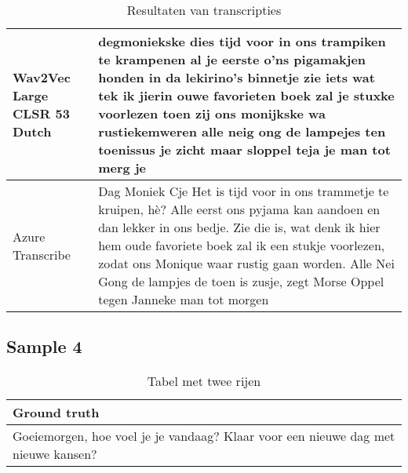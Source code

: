 \begin{table}[htbp]
\begin{tabularx}{\textwidth}{|l|X|}
    Wav2Vec Large CLSR 53 Dutch &     degmoniekske dies tijd voor in ons trampiken te krampenen al je eerste o'ns pigamakjen honden in da lekirino's binnetje zie iets wat tek ik jierin ouwe favorieten boek zal je stuxke voorlezen toen zij ons monijkske wa rustiekemweren alle neig ong de lampejes ten toenissus je zicht maar sloppel teja je man tot merg je
    \\ \hline
    
    Azure Transcribe & Dag Moniek Cje Het is tijd voor in ons trammetje te kruipen, hè? Alle eerst ons pyjama kan aandoen en dan lekker in ons bedje. Zie die is, wat denk ik hier hem oude favoriete boek zal ik een stukje voorlezen, zodat ons Monique waar rustig gaan worden. Alle Nei Gong de lampjes de toen is zusje, zegt Morse Oppel tegen Janneke man tot morgen
    \\ \hline
\end{tabularx}
    \caption{Resultaten van transcripties}
\end{table}
\FloatBarrier
\subsection{Sample 4}
\begin{table}[htbp]
    \centering
    \label{tab:groundtruth_sample4}
    \begin{tabularx}{\textwidth}{|X|}
        \hline
        \textbf{Ground truth} \\
        
        \hline
        Goeiemorgen, hoe voel je je vandaag? Klaar voor een nieuwe dag met nieuwe kansen? \\
        \hline
    \end{tabularx}
    \caption{Tabel met twee rijen}
\end{table}

